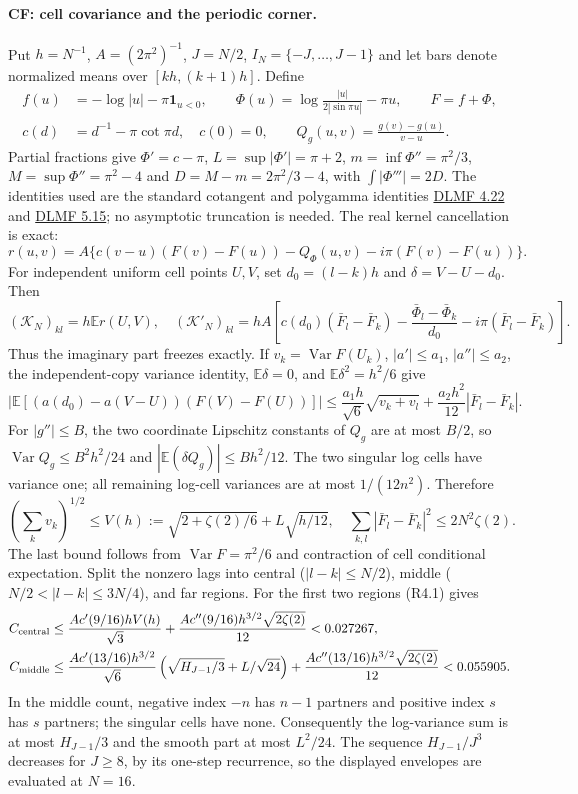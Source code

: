 \paragraph{CF: cell covariance and the periodic corner.}
Put $h=N^{-1}$, $A=(2\pi^2)^{-1}$, $J=N/2$,
$I_N=\{-J,\ldots,J-1\}$ and let bars denote normalized means over
$[kh,(k+1)h]$. Define
\[
 \begin{split}
 f(u)&=-\log|u|-\pi\mathbf1_{u<0},\qquad
 \Phi(u)=\log\frac{|u|}{2|\sin\pi u|}-\pi u,\qquad F=f+\Phi,\\
 c(d)&=d^{-1}-\pi\cot\pi d,\quad c(0)=0,\qquad
 Q_g(u,v)=\frac{g(v)-g(u)}{v-u}.
 \end{split}
\]
Partial fractions give $\Phi'=c-\pi$, $L=\sup|\Phi'|=\pi+2$,
$m=\inf\Phi''=\pi^2/3$, $M=\sup\Phi''=\pi^2-4$ and
$D=M-m=2\pi^2/3-4$, with $\int|\Phi'''|=2D$.
The identities used are the standard cotangent and polygamma identities
\href{https://dlmf.nist.gov/4.22}{DLMF 4.22} and
\href{https://dlmf.nist.gov/5.15}{DLMF 5.15}; no asymptotic truncation is needed.
The real kernel cancellation is exact:
\[
 r(u,v)=A\{c(v-u)(F(v)-F(u))-Q_\Phi(u,v)
                  -i\pi(F(v)-F(u))\}.
\]
For independent uniform cell points $U,V$, set $d_0=(l-k)h$ and
$\delta=V-U-d_0$. Then
\[
 (\mathcal K_N)_{kl}=h\mathbb E r(U,V),\quad
 (\mathcal K'_N)_{kl}=hA\left[c(d_0)(\bar F_l-\bar F_k)
 -\frac{\bar\Phi_l-\bar\Phi_k}{d_0}-i\pi(\bar F_l-\bar F_k)\right].
\]
Thus the imaginary part freezes exactly. If $v_k=\operatorname{Var}F(U_k)$,
$|a'|\le a_1$, $|a''|\le a_2$, the independent-copy variance identity,
$\mathbb E\delta=0$, and $\mathbb E\delta^2=h^2/6$ give
\[
 |\mathbb E[(a(d_0)-a(V-U))(F(V)-F(U))]|
 \le\frac{a_1h}{\sqrt6}\sqrt{v_k+v_l}
       +\frac{a_2h^2}{12}|\bar F_l-\bar F_k|.                 \tag{R4.1}
\]
For $|g''|\le B$, the two coordinate Lipschitz constants of $Q_g$ are
at most $B/2$, so $\operatorname{Var}Q_g\le B^2h^2/24$ and
$|\mathbb E(\delta Q_g)|\le Bh^2/12$.
The two singular log cells have variance one; all remaining log-cell
variances are at most $1/(12n^2)$. Therefore
\[
 (\textstyle\sum_k v_k)^{1/2}\le
 V(h):=\sqrt{2+\zeta(2)/6}+L\sqrt{h/12},\quad
 \textstyle\sum_{k,l}|\bar F_l-\bar F_k|^2\le2N^2\zeta(2).
\]
The last bound follows from $\operatorname{Var}F=\pi^2/6$ and contraction
of cell conditional expectation. Split the nonzero lags into central
($|l-k|\le N/2$), middle ($N/2<|l-k|\le3N/4$), and far regions.
For the first two regions (R4.1) gives
\[
 \begin{split}
 C_{\rm central}&\le\frac{Ac'(9/16)hV(h)}{\sqrt3}
  +\frac{Ac''(9/16)h^{3/2}\sqrt{2\zeta(2)}}{12}<0.027267,\\
 C_{\rm middle}&\le\frac{Ac'(13/16)h^{3/2}}{\sqrt6}
       \left(\sqrt{H_{J-1}/3}+L/\sqrt{24}\right)
  +\frac{Ac''(13/16)h^{3/2}\sqrt{2\zeta(2)}}{12}<0.055905.
 \end{split}
\]
In the middle count, negative index $-n$ has $n-1$ partners and positive
index $s$ has $s$ partners; the singular cells have none. Consequently
the log-variance sum is at most $H_{J-1}/3$ and the smooth part at most
$L^2/24$. The sequence $H_{J-1}/J^3$ decreases for $J\ge8$, by its
one-step recurrence, so the displayed envelopes are evaluated at $N=16$.

